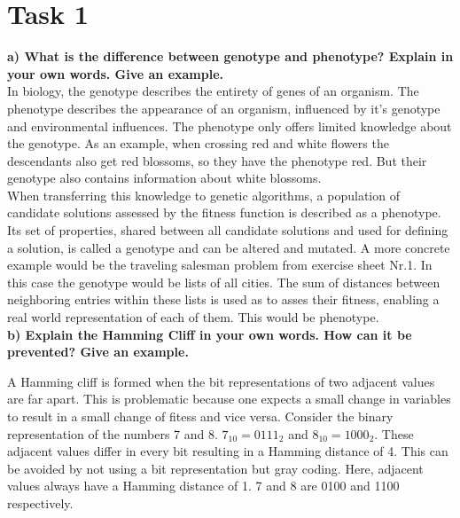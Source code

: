 \documentclass[12pt,letterpaper]{article}
\begin{document}
\section*{Task 1}
\textbf{a) What  is  the  difference  between  genotype  and  phenotype?  Explain  in  your  own  words.  Give  an example.}\\

In biology, the genotype describes the entirety of genes of an organism. The phenotype describes the appearance of an organism, influenced by it's genotype and environmental influences. The phenotype only offers limited knowledge about the genotype. As an example, when crossing red and white flowers the descendants also get red blossoms, so they have the phenotype red. But their genotype also contains information about white blossoms.\\

When transferring this knowledge to genetic algorithms, a population of candidate solutions assessed by the fitness function is described as a phenotype. Its set of properties, shared between all candidate solutions and used for defining a solution, is called a genotype and can be altered and mutated. A more concrete example would be the traveling salesman problem from exercise sheet Nr.1. In this case the genotype would be lists of all cities. The sum of distances between neighboring entries within these lists is used as to asses their fitness, enabling a real world representation of each of them. This would be  phenotype.\\

\textbf{b)  Explain the Hamming Cliff in your own words. How can it be prevented? Give an example.}

A Hamming cliff is formed when the bit representations of two adjacent values are far apart. This is problematic because one expects a small change in variables to result in a small change of fitess and vice versa. Consider the binary representation of the numbers 7 and 8. $7_{10} = 0111_{2}$ and $8_{10} = 1000_{2}$. These adjacent values differ in every bit resulting in a Hamming distance of 4. This can be avoided by not using a bit representation but gray coding. Here, adjacent values always have a Hamming distance of 1. 7 and 8 are 0100 and 1100 respectively.
\end{document}
